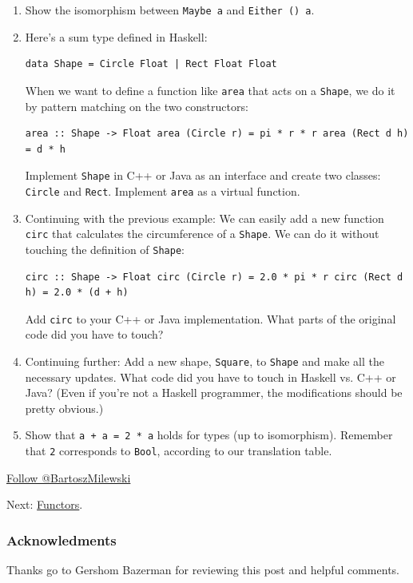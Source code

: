 \begin{enumerate}
\item
  Show the isomorphism between \texttt{Maybe\ a} and
  \texttt{Either\ ()\ a}.
\item
  Here's a sum type defined in Haskell:

\begin{verbatim}
data Shape = Circle Float | Rect Float Float
\end{verbatim}

  When we want to define a function like \texttt{area} that acts on a
  \texttt{Shape}, we do it by pattern matching on the two constructors:

\begin{verbatim}
area :: Shape -> Float area (Circle r) = pi * r * r area (Rect d h) = d * h
\end{verbatim}

  Implement \texttt{Shape} in C++ or Java as an interface and create two
  classes: \texttt{Circle} and \texttt{Rect}. Implement \texttt{area} as
  a virtual function.
\item
  Continuing with the previous example: We can easily add a new function
  \texttt{circ} that calculates the circumference of a \texttt{Shape}.
  We can do it without touching the definition of \texttt{Shape}:

\begin{verbatim}
circ :: Shape -> Float circ (Circle r) = 2.0 * pi * r circ (Rect d h) = 2.0 * (d + h)
\end{verbatim}

  Add \texttt{circ} to your C++ or Java implementation. What parts of
  the original code did you have to touch?
\item
  Continuing further: Add a new shape, \texttt{Square}, to
  \texttt{Shape} and make all the necessary updates. What code did you
  have to touch in Haskell vs. C++ or Java? (Even if you're not a
  Haskell programmer, the modifications should be pretty obvious.)
\item
  Show that \texttt{a\ +\ a\ =\ 2\ *\ a} holds for types (up to
  isomorphism). Remember that \texttt{2} corresponds to \texttt{Bool},
  according to our translation table.
\end{enumerate}

\href{https://twitter.com/BartoszMilewski}{Follow @BartoszMilewski}

Next: \href{https://bartoszmilewski.com/2015/01/20/functors/}{Functors}.

\subsubsection{Acknowledments}\label{acknowledments}

Thanks go to Gershom Bazerman for reviewing this post and helpful
comments.
